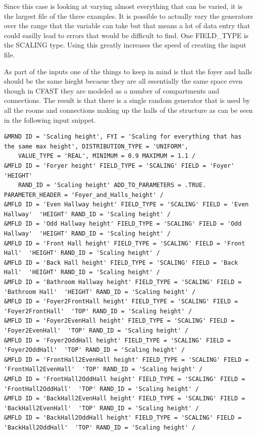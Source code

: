 \documentclass[12pt,twoside]{book}
\begin{document}
Since this case is looking at varying almost everything that can be varied, it is the largest file of the three examples. It is possible to actually vary the generators over the range that the variable can take but that means a lot of data entry that could easilly lead to errors that would be difficult to find. One FIELD\_TYPE is the SCALING type. Using this greatly increases the speed of creating the input file.

As part of the inputs one of the things to keep in mind is that the foyer and halls should be the same hieght becasue they are all essentially the same space even though in CFAST they are modeled as a number of compartments and connections. The result is that there is a single random generator that is used by all the rooms and connections making up the halls of the structure as can be seen in the following input snippet.


\vspace{\baselineskip}
\begin{lstlisting}
&MRND ID = 'Scaling height', FYI = 'Scaling for everything that has the same max height', DISTRIBUTION_TYPE = 'UNIFORM',
    VALUE_TYPE = 'REAL', MINIMUM = 0.9 MAXIMUM = 1.1 /
&MFLD ID = 'Foryer height' FIELD_TYPE = 'SCALING' FIELD = 'Foyer'  'HEIGHT'
    RAND_ID = 'Scaling height' ADD_TO_PARAMETERS = .TRUE. PARAMETER_HEADER = 'Foyer_and_Halls_height' /
&MFLD ID = 'Even Hallway height' FIELD_TYPE = 'SCALING' FIELD = 'Even Hallway'  'HEIGHT' RAND_ID = 'Scaling height' /
&MFLD ID = 'Odd Hallway height' FIELD_TYPE = 'SCALING' FIELD = 'Odd Hallway'  'HEIGHT' RAND_ID = 'Scaling height' /
&MFLD ID = 'Front Hall height' FIELD_TYPE = 'SCALING' FIELD = 'Front Hall'  'HEIGHT' RAND_ID = 'Scaling height' /
&MFLD ID = 'Back Hall height' FIELD_TYPE = 'SCALING' FIELD = 'Back Hall'  'HEIGHT' RAND_ID = 'Scaling height' /
&MFLD ID = 'Bathroom Hallway height' FIELD_TYPE = 'SCALING' FIELD = 'Bathroom Hall'  'HEIGHT' RAND_ID = 'Scaling height' /
&MFLD ID = 'Foyer2FrontHall height' FIELD_TYPE = 'SCALING' FIELD = 'Foyer2FrontHall'  'TOP' RAND_ID = 'Scaling height' /
&MFLD ID = 'Foyer2EvenHall height' FIELD_TYPE = 'SCALING' FIELD = 'Foyer2EvenHall'  'TOP' RAND_ID = 'Scaling height' /
&MFLD ID = 'Foyer2OddHall height' FIELD_TYPE = 'SCALING' FIELD = 'Foyer2OddHall'  'TOP' RAND_ID = 'Scaling height' /
&MFLD ID = 'FrontHall2EvenHall height' FIELD_TYPE = 'SCALING' FIELD = 'FrontHall2EvenHall'  'TOP' RAND_ID = 'Scaling height' /
&MFLD ID = 'FrontHall2OddHall height' FIELD_TYPE = 'SCALING' FIELD = 'FrontHall2OddHall'  'TOP' RAND_ID = 'Scaling height' /
&MFLD ID = 'BackHall2EvenHall height' FIELD_TYPE = 'SCALING' FIELD = 'BackHall2EvenHall'  'TOP' RAND_ID = 'Scaling height' /
&MFLD ID = 'BackHall2OddHall height' FIELD_TYPE = 'SCALING' FIELD = 'BackHall2OddHall'  'TOP' RAND_ID = 'Scaling height' /
\end{lstlisting}
\end{document}
